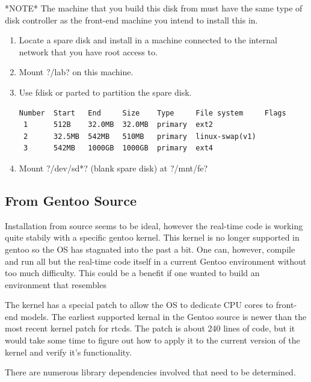 *NOTE* The machine that you build this disk from must have the same type of disk controller as the front-end machine you intend to install this in.

\begin{enumerate}
    \item Locate a spare disk and install in a machine connected to the internal network that you have root access to.
    \item Mount \lstin?/lab? on this machine.
    \item Use fdisk or parted to partition the spare disk.
\begin{lstlisting}
Number  Start   End     Size    Type     File system     Flags
 1      512B    32.0MB  32.0MB  primary  ext2
 2      32.5MB  542MB   510MB   primary  linux-swap(v1)
 3      542MB   1000GB  1000GB  primary  ext4
\end{lstlisting}
    \item Mount \lstin?/dev/sd*? (blank spare disk) at \lstin?/mnt/fe?
\end{enumerate}

\subsection{From Gentoo Source}
Installation from source seems to be ideal, however the real-time code is
working quite stabily with a specific gentoo kernel. This kernel is no longer
supported in gentoo so the OS has stagnated into the past a bit. One can, however,
compile and run all but the real-time code itself in a current Gentoo environment
without too much difficulty. This could be a benefit if one wanted to build an
environment that resembles

The kernel has a special patch to allow the OS to dedicate CPU cores to
front-end models. The earliest supported kernal in the Gentoo source is newer
than the most recent kernel patch for rtcds. The patch is about 240
lines of code, but it would take some time to figure out how to apply it to
the current version of the kernel and verify it's functionality.

There are numerous library dependencies involved that need to be determined.

